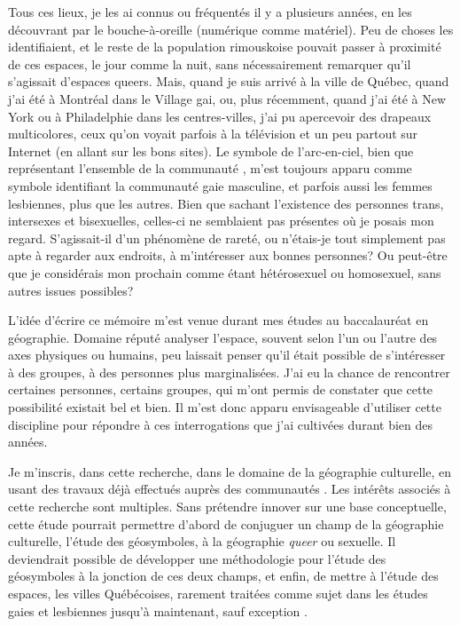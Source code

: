 Tous ces lieux, je les ai connus ou fréquentés il y a plusieurs années, en les découvrant par le bouche-à-oreille (numérique comme matériel).
Peu de choses les identifiaient, et le reste de la population rimouskoise pouvait passer à proximité de ces espaces, le jour comme la nuit, sans nécessairement remarquer qu'il s'agissait d'espaces queers.
Mais, quand je suis arrivé à la ville de Québec, quand j'ai été à Montréal dans le Village gai, ou, plus récemment, quand j'ai été à New York ou à Philadelphie dans les centres-villes, j'ai pu apercevoir des drapeaux multicolores, ceux qu'on voyait parfois à la télévision et un peu partout sur Internet (en allant sur les bons sites).
Le symbole de l'arc-en-ciel, bien que représentant l'ensemble de la communauté \lgbt{}, m'est toujours apparu comme symbole identifiant la communauté gaie masculine, et parfois aussi les femmes lesbiennes, plus que les autres.
Bien que sachant l'existence des personnes trans, intersexes et bisexuelles, celles-ci ne semblaient pas présentes où je posais mon regard.
S'agissait-il d'un phénomène de rareté, ou n’étais-je tout simplement pas apte à regarder aux endroits, à m'intéresser aux bonnes personnes?
Ou peut-être que je considérais mon prochain comme étant hétérosexuel ou homosexuel, sans autres issues possibles?

L'idée d'écrire ce mémoire m'est venue durant mes études au baccalauréat en géographie.
Domaine réputé analyser l'espace, souvent selon l'un ou l'autre des axes physiques ou humains, peu laissait penser qu'il était possible de s'intéresser à des groupes, à des personnes plus marginalisées.
J'ai eu la chance de rencontrer certaines personnes, certains groupes, qui m'ont permis de constater que cette possibilité existait bel et bien.
Il m'est donc apparu envisageable d'utiliser cette discipline pour répondre à ces interrogations que j'ai cultivées durant bien des années.

Je m'inscris, dans cette recherche, dans le domaine de la géographie culturelle, en usant des travaux déjà effectués auprès des communautés \lgbt{}.
Les intérêts associés à cette recherche sont multiples.
Sans prétendre innover sur une base conceptuelle, cette étude pourrait permettre d'abord de conjuguer un champ de la géographie culturelle, l'étude des géosymboles, à la géographie \emph{queer} ou sexuelle.
Il deviendrait possible de développer une méthodologie pour l'étude des géosymboles à la jonction de ces deux champs, et enfin, de mettre à l'étude des espaces, les villes Québécoises, rarement traitées comme sujet dans les études gaies et lesbiennes jusqu'à maintenant, sauf exception \parencite{Chamberland1993,Podmore2006,Podmore2001,Hebert2012,Hunt2008,Laprade2014}.

